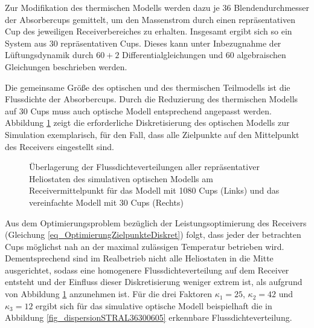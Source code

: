 Zur Modifikation des thermischen Modells werden dazu je $36$ Blendendurchmesser der Absorbercups gemittelt, um den Massenstrom durch einen repräsentativen Cup des jeweiligen Receiverbereiches zu erhalten.
Insgesamt ergibt sich so ein System aus $30$ repräsentativen Cups.
Dieses kann unter Inbezugnahme der Lüftungsdynamik durch $60+2$ Differentialgleichungen und $60$ algebraischen Gleichungen beschrieben werden.

Die gemeinsame Größe des optischen und des thermischen Teilmodells ist die Flussdichte der Absorbercups.
Durch die Reduzierung des thermischen Modells auf $30$ Cups muss auch optische Modell entsprechend angepasst werden.
Abbildung \ref{fig_statischerZielpunkt363065} zeigt die erforderliche Diskretisierung des optischen Modells zur Simulation exemplarisch, für den Fall, dass alle Zielpunkte auf den Mittelpunkt des Receivers eingestellt sind.

\begin{figure}[h!]
    \centering
    \setlength{\fboxsep}{1pt}
    \setlength{\fboxrule}{1pt}
    \caption[Überlagerung der Flussdichteverteilungen aller repräsentativer Heliostaten des simulativen optischen Modells am Receivermittelpunkt für das Modell mit 1080 Cups und das vereinfachte Modell mit 30 Cups]{Überlagerung der Flussdichteverteilungen aller repräsentativer Heliostaten des simulativen optischen Modells am Receivermittelpunkt für das Modell mit 1080 Cups (Links) und das vereinfachte Modell mit 30 Cups (Rechts)}
    \label{fig_statischerZielpunkt363065}
\end{figure}

Aus dem Optimierungsproblem bezüglich der Leistungsoptimierung des Receivers (Gleichung \ref{eq_OptimierungZielpunkteDiskret}) folgt, dass jeder der betrachten Cups möglichst nah an der maximal zulässigen Temperatur betrieben wird.
Dementsprechend sind im Realbetrieb nicht alle Heliostaten in die Mitte ausgerichtet, sodass eine homogenere Flussdichteverteilung auf dem Receiver entsteht und der Einfluss dieser Diskretisierung weniger extrem ist, als aufgrund von Abbildung \ref{fig_statischerZielpunkt363065} anzunehmen ist.
Für die drei Faktoren $\kappa_1 = 25$, $\kappa_2 = 42$ und $\kappa_3 = 12$ ergibt sich für das simulative optische Modell beispielhaft die in Abbildung \ref{fig_dispersionSTRAL36300605} erkennbare Flussdichteverteilung.

